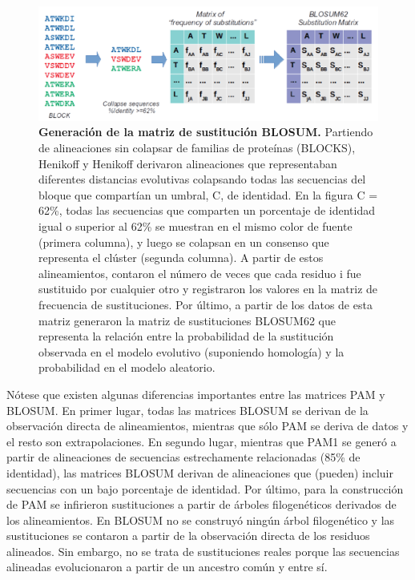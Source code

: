 \begin{figure}[htbp]
\centering
\includegraphics[width = \textwidth]{figs/blosum-matrix.png}
\caption{\textbf{Generación de la matriz de sustitución BLOSUM.} Partiendo de alineaciones sin colapsar de familias de proteínas (BLOCKS), Henikoff y Henikoff derivaron alineaciones que representaban diferentes distancias evolutivas colapsando todas las secuencias del bloque que compartían un umbral, C, de identidad. En la figura C = 62\%, todas las secuencias que comparten un porcentaje de identidad igual o superior al 62\% se muestran en el mismo color de fuente (primera columna), y luego se colapsan en un consenso que representa el clúster (segunda columna). A partir de estos alineamientos, contaron el número de veces que cada residuo i fue sustituido por cualquier otro y registraron los valores en la matriz de frecuencia de sustituciones. Por último, a partir de los datos de esta matriz generaron la matriz de sustituciones BLOSUM62 que representa la relación entre la probabilidad de la sustitución observada en el modelo evolutivo (suponiendo homología) y la probabilidad en el modelo aleatorio.}
\label{fig:blosum}
\end{figure}

Nótese que existen algunas diferencias importantes entre las matrices PAM y BLOSUM. En primer lugar, todas las matrices BLOSUM se derivan de la observación directa de alineamientos, mientras que sólo PAM se deriva de datos y el resto son extrapolaciones. En segundo lugar, mientras que PAM1 se generó a partir de alineaciones de secuencias estrechamente relacionadas (85\% de identidad), las matrices BLOSUM derivan de alineaciones que (pueden) incluir secuencias con un bajo porcentaje de identidad. Por último, para la construcción de PAM se infirieron sustituciones a partir de árboles filogenéticos derivados de los alineamientos. En BLOSUM no se construyó ningún árbol filogenético y las sustituciones se contaron a partir de la observación directa de los residuos alineados. Sin embargo, no se trata de sustituciones reales porque las secuencias alineadas evolucionaron a partir de un ancestro común y entre sí.

